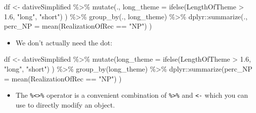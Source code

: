 \documentclass[
]{book}
\newenvironment{Shaded}{\begin{snugshade}}{\end{snugshade}}
\newcommand{\AttributeTok}[1]{\textcolor[rgb]{0.77,0.63,0.00}{#1}}
\newcommand{\FloatTok}[1]{\textcolor[rgb]{0.00,0.00,0.81}{#1}}
\newcommand{\FunctionTok}[1]{\textcolor[rgb]{0.00,0.00,0.00}{#1}}
\newcommand{\NormalTok}[1]{#1}
\newcommand{\OtherTok}[1]{\textcolor[rgb]{0.56,0.35,0.01}{#1}}
\newcommand{\SpecialCharTok}[1]{\textcolor[rgb]{0.00,0.00,0.00}{#1}}
\newcommand{\StringTok}[1]{\textcolor[rgb]{0.31,0.60,0.02}{#1}}
\providecommand{\tightlist}{%
  \setlength{\itemsep}{0pt}\setlength{\parskip}{0pt}}
\begin{document}
\begin{Shaded}
\begin{Highlighting}[]
\NormalTok{df }\OtherTok{\textless{}{-}}\NormalTok{  dativeSimplified }\SpecialCharTok{\%\textgreater{}\%}
          \FunctionTok{mutate}\NormalTok{(., }\AttributeTok{long\_theme =} \FunctionTok{ifelse}\NormalTok{(LengthOfTheme }\SpecialCharTok{\textgreater{}} \FloatTok{1.6}\NormalTok{, }\StringTok{"long"}\NormalTok{, }\StringTok{"short"}\NormalTok{) ) }\SpecialCharTok{\%\textgreater{}\%} 
          \FunctionTok{group\_by}\NormalTok{(., long\_theme) }\SpecialCharTok{\%\textgreater{}\%} 
\NormalTok{          dplyr}\SpecialCharTok{::}\FunctionTok{summarize}\NormalTok{(., }\AttributeTok{perc\_NP =} \FunctionTok{mean}\NormalTok{(RealizationOfRec }\SpecialCharTok{==} \StringTok{"NP"}\NormalTok{) )}
\end{Highlighting}
\end{Shaded}

\begin{itemize}
\tightlist
\item
  We don't actually need the dot:
\end{itemize}

\begin{Shaded}
\begin{Highlighting}[]
\NormalTok{df }\OtherTok{\textless{}{-}}\NormalTok{  dativeSimplified }\SpecialCharTok{\%\textgreater{}\%}
          \FunctionTok{mutate}\NormalTok{(}\AttributeTok{long\_theme =} \FunctionTok{ifelse}\NormalTok{(LengthOfTheme }\SpecialCharTok{\textgreater{}} \FloatTok{1.6}\NormalTok{, }\StringTok{"long"}\NormalTok{, }\StringTok{"short"}\NormalTok{) ) }\SpecialCharTok{\%\textgreater{}\%} 
          \FunctionTok{group\_by}\NormalTok{(long\_theme) }\SpecialCharTok{\%\textgreater{}\%} 
\NormalTok{          dplyr}\SpecialCharTok{::}\FunctionTok{summarize}\NormalTok{(}\AttributeTok{perc\_NP =} \FunctionTok{mean}\NormalTok{(RealizationOfRec }\SpecialCharTok{==} \StringTok{"NP"}\NormalTok{) )}
\end{Highlighting}
\end{Shaded}

\begin{itemize}
\tightlist
\item
  The \texttt{\%\textless{}\textgreater{}\%} operator is a convenient combination of \texttt{\%\textgreater{}\%} and \texttt{\textless{}-} which you can use to directly modify an object.
\end{itemize}
\end{document}
